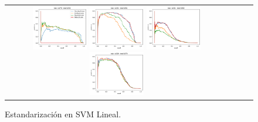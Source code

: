 \begin{figure}[h!]
\begin{tabular}{cccc}
  \includegraphics[width=0.25\textwidth]{Kap4/Figure_1.png}  \includegraphics[width=0.25\textwidth]{Kap4/Figure_2.png} 
  \includegraphics[width=0.25\textwidth]{Kap4/Figure_3.png}  \includegraphics[width=0.25\textwidth]{Kap4/Figure_4.png} 
\end{tabular}
\caption{Estandarización en SVM Lineal.}
\label{fig:svml_estandarizacion}
\end{figure}

